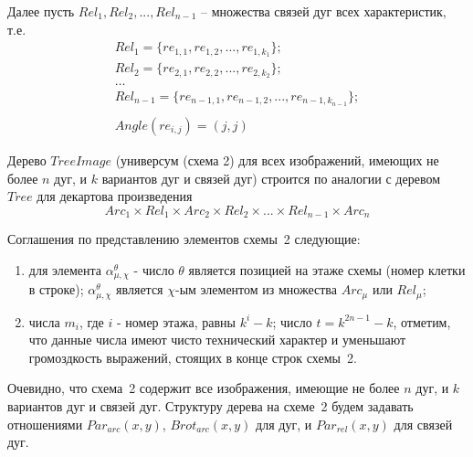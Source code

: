 Далее пусть $Rel_1, Rel_2, ..., Rel_{n-1}$ – множества связей дуг всех характеристик, т.е. 
\begin{equation}
\begin{array}{c}
Rel_1 = \{re_{1,1}, re_{1,2}, ..., re_{1,k_1}\}; \\
Rel_2 = \{ re_{2,1}, re_{2,2}, ..., re_{2,k_2}\}; \\
\dots \\
Rel_{n-1} = \{ re_{{n-1},1}, re_{{n-1},2}, ..., re_{{n-1},k_{n-1}}\}; \\
\\
Angle(re_{i,j})=(j,j)
\end{array}
\end{equation}

Дерево $TreeImage$ (универсум (схема 2) для всех изображений, имеющих не более $n$ дуг, и $k$ вариантов дуг и связей дуг) строится по аналогии с деревом $Tree$ для декартова произведения
$$Arc_1 \times Rel_1 \times Arc_2 \times Rel_2 \times ... \times Rel_{n-1} \times Arc_n $$


Соглашения по представлению элементов схемы~2 следующие:
\begin{enumerate}
\item для элемента $\alpha_{\mu,\chi}^\theta$ - число $\theta$ является позицией на этаже схемы (номер клетки в строке); $\alpha_{\mu,\chi}^\theta$ является $\chi$-ым элементом из множества $Arc_{\mu}$ или $Rel_{\mu}$;
\item числа $m_i$, где $i$ - номер этажа, равны $k^i - k$; число $t = k^{2n-1}-k$, отметим, что данные числа имеют чисто технический характер и уменьшают громоздкость выражений, стоящих в конце строк схемы~2.
\end{enumerate}

Очевидно, что схема~2 содержит все изображения, имеющие не более $n$ дуг, и $k$ 
вариантов дуг и связей дуг. 
Структуру дерева на схеме~2 будем задавать отношениями 
$Par_{arc}(x,y)$, $Brot_{arc}(x,y)$ для дуг, и $Par_{rel}(x,y)$ для связей дуг.

